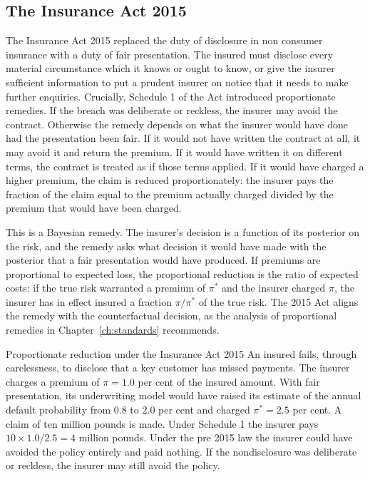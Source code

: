 \subsection{The Insurance Act 2015}

The Insurance Act 2015 replaced the duty of disclosure in non consumer insurance with a duty of fair presentation. The insured must disclose every material circumstance which it knows or ought to know, or give the insurer sufficient information to put a prudent insurer on notice that it needs to make further enquiries. Crucially, Schedule 1 of the Act introduced proportionate remedies. If the breach was deliberate or reckless, the insurer may avoid the contract. Otherwise the remedy depends on what the insurer would have done had the presentation been fair. If it would not have written the contract at all, it may avoid it and return the premium. If it would have written it on different terms, the contract is treated as if those terms applied. If it would have charged a higher premium, the claim is reduced proportionately: the insurer pays the fraction of the claim equal to the premium actually charged divided by the premium that would have been charged.

This is a Bayesian remedy. The insurer's decision is a function of its posterior on the risk, and the remedy asks what decision it would have made with the posterior that a fair presentation would have produced. If premiums are proportional to expected loss, the proportional reduction is the ratio of expected costs: if the true risk warranted a premium of $\pi^\ast$ and the insurer charged $\pi$, the insurer has in effect insured a fraction $\pi/\pi^\ast$ of the true risk. The 2015 Act aligns the remedy with the counterfactual decision, as the analysis of proportional remedies in Chapter~\ref{ch:standards} recommends.

\begin{casebox}{Proportionate reduction under the Insurance Act 2015}
An insured fails, through carelessness, to disclose that a key customer has missed payments. The insurer charges a premium of $\pi = 1.0$ per cent of the insured amount. With fair presentation, its underwriting model would have raised its estimate of the annual default probability from $0.8$ to $2.0$ per cent and charged $\pi^\ast = 2.5$ per cent. A claim of ten million pounds is made. Under Schedule 1 the insurer pays $10 \times 1.0/2.5 = 4$ million pounds. Under the pre 2015 law the insurer could have avoided the policy entirely and paid nothing. If the nondisclosure was deliberate or reckless, the insurer may still avoid the policy.
\end{casebox}

